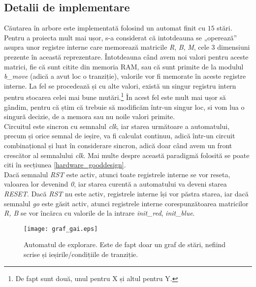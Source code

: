 \documentclass[12pt,twoside,a4paper,fleqn]{book}
\theoremstyle{definition}
\begin{document}
\subsection{Detalii de implementare}
Căutarea în arbore este implementată folosind un automat finit cu $15$ stări. Pentru a proiecta mult mai ușor, s-a considerat că intotdeauna se „operează” asupra unor registre interne care memorează matricile \emph{R}, \emph{B}, \emph{M}, cele $3$ dimensiuni prezente în această reprezentare. Întotdeauna când avem noi valori pentru aceste matrici, fie că sunt citite din memoria RAM, sau că sunt primite de la modulul \emph{b\_move} (adică a avut loc o tranziție), valorile vor fi memorate în aceste registre interne. La fel se procedează și cu alte valori, există un singur registru intern pentru stocarea celei mai bune mutări.\footnote{De fapt sunt două, unul pentru X și altul pentru Y.} În acest fel este mult mai ușor să gândim, pentru că știm că trebuie să modificăm într-un singur loc, si vom lua o singură decizie, de a memora sau nu noile valori primite.\\
Circuitul este sincron cu semnalul \emph{clk}, iar starea următoare a automatului, precum și orice semnal de ieșire, va fi calculat continuu, adică într-un circuit combinațional și luat în considerare sincron, adică doar când avem un front crescător al semnalului \emph{clk}. Mai multe despre această paradigmă folosită se poate citi în secțiunea \ref{hardware_gooddesign}.\\
Dacă semnalul \emph{RST} este activ, atunci toate registrele interne se vor reseta, valoarea lor devenind \emph{0}, iar starea curentă a automatului va deveni starea \emph{RESET}. Dacă \emph{RST} nu este activ, registrele interne își vor păstra starea, iar dacă semnalul \emph{go} este găsit activ, atunci registrele interne corespunzătoarea matricilor \emph{R, B} se vor încărca cu valorile de la intrare \emph{init\_red}, \emph{init\_blue}.
\begin{figure}[h]
\texttt{[image: graf\_gai.eps]}
\caption{\small{Automatul de explorare. Este de fapt doar un graf de stări, nefiind scrise și ieșirile/condițiile de tranziție.}}
\label{fig:fig_aut}
\end{figure}
\end{document}
